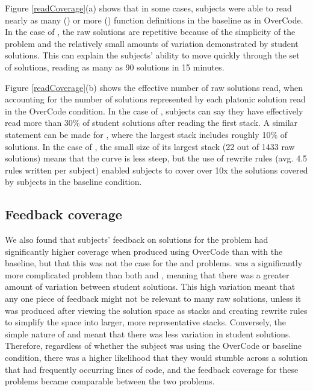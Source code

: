 Figure \ref{readCoverage}(a) shows that in some cases, subjects were able to read nearly as many () or more () function definitions in the baseline as in OverCode. In the case of , the raw solutions are repetitive because of the simplicity of the problem and the relatively small amounts of variation demonstrated by student solutions. This can explain the subjects' ability to move quickly through the set of solutions, reading as many as 90 solutions in 15 minutes.

Figure \ref{readCoverage}(b) shows the effective number of raw solutions read, when accounting for the number of solutions represented by each platonic solution read in the OverCode condition. In the case of , subjects can say they have effectively read more than 30\% of student solutions after reading the first stack. A similar statement can be made for , where the largest stack includes roughly 10\% of solutions. In the case of , the small size of its largest stack (22 out of 1433 raw solutions) means that the curve is less steep, but the use of rewrite rules (avg. 4.5 rules written per  subject) enabled subjects to cover over 10x the solutions covered by subjects in the baseline condition.

\subsection{Feedback coverage}
We also found that subjects' feedback on solutions for the  problem had significantly higher coverage when produced using OverCode than with the baseline, but that this was not the case for the  and  problems.  was a significantly more complicated problem than both  and , meaning that there was a greater amount of variation between student solutions. This high variation meant that any one piece of feedback might not be relevant to many raw solutions, unless it was produced after viewing the solution space as stacks and creating rewrite rules to simplify the space into larger, more representative stacks. Conversely, the simple nature of  and  meant that there was less variation in student solutions. Therefore, regardless of whether the subject was using the OverCode or baseline condition, there was a higher likelihood that they would stumble across a solution that had frequently occurring lines of code, and the feedback coverage for these problems became comparable between the two problems.

